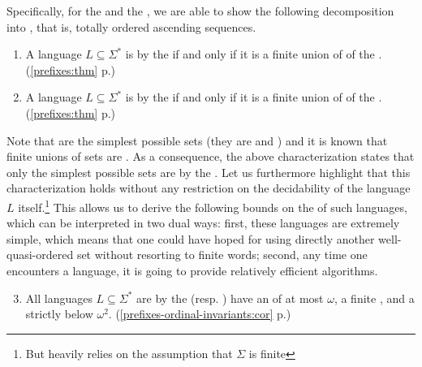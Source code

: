 Specifically, for the  and the
, we are able to show the following decomposition into
, that is, totally ordered ascending sequences.

{
\renewcommand{\labelenumi}{R\arabic{enumi}}
\begin{enumerate}
	\item A language $L \subseteq \Sigma^*$ is  by the  if and only if it is a finite union of  of the .
    \hfill (\cref{prefixes:thm} p.\pageref{prefixes:thm})
	\item A language $L \subseteq \Sigma^*$ is  by the  if and only if it is a finite union of  of the .
    \hfill (\cref{prefixes:thm} p.\pageref{prefixes:thm})
\end{enumerate}
}

Note that  are the simplest possible  sets
(they are  and ) and it is known that finite unions
of  sets are . As a consequence,
the above characterization states that only the simplest possible
 sets are  by the . Let us furthermore highlight that this characterization holds
without any restriction on the decidability of the language $L$ itself.\footnote{But
heavily relies on the assumption that $\Sigma$ is finite} This allows us to
derive the following bounds on the  of such
 languages, which can be interpreted in two dual ways:
first, these languages are extremely simple, which means that one could have
hoped for using directly another well-quasi-ordered set without resorting to
finite words; second, any time one encounters a 
language, it is going to provide relatively efficient algorithms.
{
\renewcommand{\labelenumi}{R\arabic{enumi}}
\begin{enumerate}
    \setcounter{enumi}{2}
    \item All languages $L \subseteq \Sigma^*$ are 
         by the  
        (resp. ) have an  of at most $\omega$,
        a finite , and a  strictly
        below $\omega^2$.
        \hfill (\cref{prefixes-ordinal-invariants:cor} p.\pageref{prefixes-ordinal-invariants:cor})
\end{enumerate}
}



